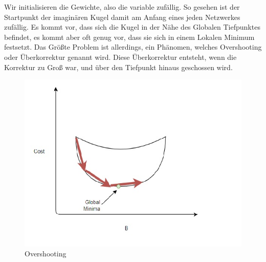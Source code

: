 \documentclass[12pt]{article}
\begin{document}
Wir initialisieren die Gewichte, also die variable zufällig. So gesehen ist der Startpunkt der imaginären Kugel damit am Anfang eines jeden Netzwerkes zufällig. Es kommt vor, dass sich die Kugel in der Nähe des Globalen Tiefpunktes befindet, es kommt aber oft genug vor, dass sie sich in einem Lokalen Minimum festsetzt. 
Das Größte Problem ist allerdings, ein Phänomen, welches Overshooting oder Überkorrektur genannt wird. Diese Überkorrektur entsteht, wenn die Korrektur zu Groß war, und über den Tiefpunkt hinaus geschossen wird.
\begin{figure}[H]
\centering
\includegraphics[scale=0.60]{./Images/Pasted image 20230915222826.png}
\caption{Overshooting}
\label{Was kommt hier rein?}
\end{figure}
\end{document}
